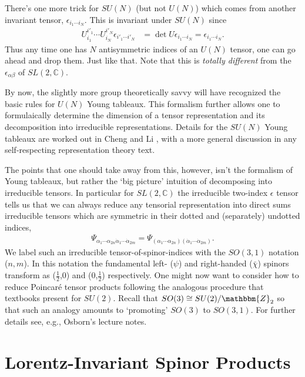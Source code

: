 There's one more trick for $SU(N)$ (but not $U(N)$) which comes from another invariant tensor, $\epsilon_{i_1\cdots i_N}$. This is invariant under $SU(N)$ since
\begin{align}
    U_{i_1}^{i'_1}\cdots U_{i_N}^{i'_N} \epsilon_{i'_1\cdots i'_N} &= \det U \epsilon_{i_1\cdots i_N} = \epsilon_{i_1\cdots i_N}.
\end{align} 
Thus any time one has $N$ antisymmetric indices of an $U(N)$ tensor, one can go ahead and drop them. Just like that. 
Note that this is \textit{totally different} from the $\epsilon_{\alpha\beta}$ of $SL(2,\mathbb{C})$.

By now, the slightly more group theoretically savvy will have recognized the basic rules for $U(N)$ Young tableaux. This formalism further allows one to formulaically determine the dimension of a tensor representation and its decomposition into irreducible representations. Details for the $SU(N)$ Young tableaux are worked out in Cheng and Li \cite{chengandli}, with a more general discussion in any self-respecting representation theory text. 


The points that one should take away from this, however, isn't the formalism of Young tableaux, but rather the `big picture' intuition of decomposing into irreducible tensors. In particular for $SL(2,\mathbb{C})$ the irreducible two-index $\epsilon$ tensor tells us that we can always reduce any tensorial representation into direct sums irreducible tensors which are symmetric in their dotted and (separately) undotted indices,
\begin{align}
    \Psi_{\alpha_1\cdots\alpha_{2n} \dot\alpha_1\cdots\dot\alpha_{2m}} = 
    \Psi_{(\alpha_1\cdots\alpha_{2n}) (\dot\alpha_1\cdots\dot\alpha_{2m})}.
\end{align}
%
We label such an irreducible tensor-of-spinor-indices with the $SO(3,1)$ notation ($n,m$). In this notation the fundamental left- ($\psi$) and right-handed ($\bar\chi$) spinors transform as ($\frac 12$,0) and (0,$\frac 12$) respectively. One might now want to consider how to reduce Poincar\'e tensor products following the analogous procedure that textbooks present for $SU(2)$. Recall that $SO(3)\cong SU(2)/\mathbbm{Z}_2$ so that such an analogy amounts to `promoting' $SO(3)$ to $SO(3,1)$. For further details see, e.g., Osborn's lecture notes\autocite{Osborn:Symmetries}.

\section{Lorentz-Invariant Spinor Products}

